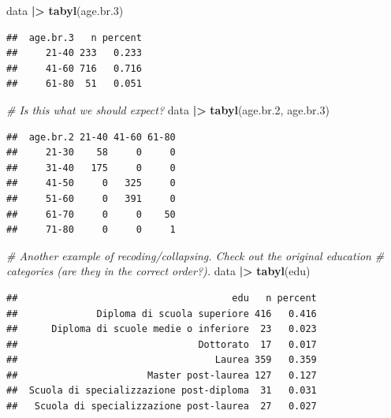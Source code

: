 \documentclass[
]{book}
\newenvironment{Shaded}{\begin{snugshade}}{\end{snugshade}}
\newcommand{\CommentTok}[1]{\textcolor[rgb]{0.56,0.35,0.01}{\textit{#1}}}
\newcommand{\FloatTok}[1]{\textcolor[rgb]{0.00,0.00,0.81}{#1}}
\newcommand{\FunctionTok}[1]{\textcolor[rgb]{0.13,0.29,0.53}{\textbf{#1}}}
\newcommand{\NormalTok}[1]{#1}
\newcommand{\SpecialCharTok}[1]{\textcolor[rgb]{0.81,0.36,0.00}{\textbf{#1}}}
\begin{document}
\begin{Shaded}
\begin{Highlighting}[]
\NormalTok{data }\SpecialCharTok{|\textgreater{}} 
  \FunctionTok{tabyl}\NormalTok{(age.br}\FloatTok{.3}\NormalTok{)}
\end{Highlighting}
\end{Shaded}

\begin{verbatim}
##  age.br.3   n percent
##     21-40 233   0.233
##     41-60 716   0.716
##     61-80  51   0.051
\end{verbatim}

\begin{Shaded}
\begin{Highlighting}[]
\CommentTok{\# Is this what we should expect?}
\NormalTok{data }\SpecialCharTok{|\textgreater{}} 
  \FunctionTok{tabyl}\NormalTok{(age.br}\FloatTok{.2}\NormalTok{, age.br}\FloatTok{.3}\NormalTok{)}
\end{Highlighting}
\end{Shaded}

\begin{verbatim}
##  age.br.2 21-40 41-60 61-80
##     21-30    58     0     0
##     31-40   175     0     0
##     41-50     0   325     0
##     51-60     0   391     0
##     61-70     0     0    50
##     71-80     0     0     1
\end{verbatim}

\begin{Shaded}
\begin{Highlighting}[]
\CommentTok{\# Another example of recoding/collapsing. Check out the original education }
\CommentTok{\# categories (are they in the correct order?).}
\NormalTok{data }\SpecialCharTok{|\textgreater{}} 
  \FunctionTok{tabyl}\NormalTok{(edu)}
\end{Highlighting}
\end{Shaded}

\begin{verbatim}
##                                      edu   n percent
##              Diploma di scuola superiore 416   0.416
##      Diploma di scuole medie o inferiore  23   0.023
##                                Dottorato  17   0.017
##                                   Laurea 359   0.359
##                       Master post-laurea 127   0.127
##  Scuola di specializzazione post-diploma  31   0.031
##   Scuola di specializzazione post-laurea  27   0.027
\end{verbatim}
\end{document}
